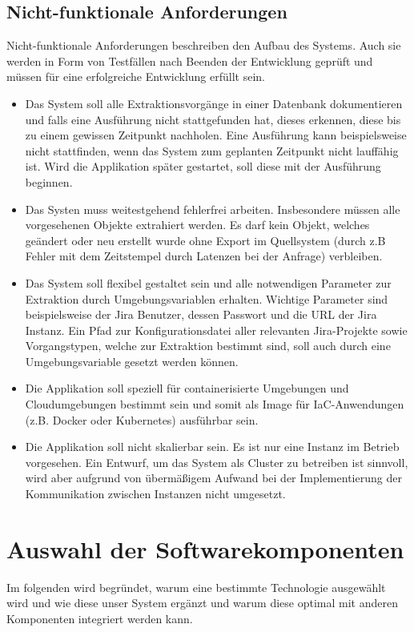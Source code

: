 \documentclass[10pt]{article}
\begin{document}
\subsection{Nicht-funktionale Anforderungen}
Nicht-funktionale Anforderungen beschreiben den Aufbau des Systems. Auch sie werden in Form von Testfällen nach Beenden der Entwicklung geprüft und müssen für eine erfolgreiche Entwicklung erfüllt sein.\\
\begin{itemize}
\item Das System soll alle Extraktionsvorgänge in einer Datenbank dokumentieren und falls eine Ausführung nicht stattgefunden hat, dieses erkennen, diese bis zu einem gewissen Zeitpunkt nachholen. Eine Ausführung kann beispielsweise nicht stattfinden, wenn das System zum geplanten Zeitpunkt nicht lauffähig ist. Wird die Applikation später gestartet, soll diese mit der Ausführung beginnen.
\item Das Systen muss weitestgehend fehlerfrei arbeiten. Insbesondere müssen alle vorgesehenen Objekte extrahiert werden. Es darf kein Objekt, welches geändert oder neu erstellt wurde ohne Export im Quellsystem (durch z.B Fehler mit dem Zeitstempel durch Latenzen bei der Anfrage) verbleiben.
\item Das System soll flexibel gestaltet sein und alle notwendigen Parameter zur Extraktion durch Umgebungsvariablen erhalten. Wichtige Parameter sind beispielsweise der Jira Benutzer, dessen Passwort und die URL der Jira Instanz. Ein Pfad zur Konfigurationsdatei aller relevanten Jira-Projekte sowie Vorgangstypen, welche zur Extraktion bestimmt sind, soll auch durch eine Umgebungsvariable gesetzt werden können.
\item Die Applikation soll speziell für containerisierte Umgebungen und Cloudumgebungen bestimmt sein und somit als Image für IaC-Anwendungen (z.B. Docker oder Kubernetes) ausführbar sein.
\item Die Applikation soll nicht skalierbar sein. Es ist nur eine Instanz im Betrieb vorgesehen. Ein Entwurf, um das System als Cluster zu betreiben ist sinnvoll, wird aber aufgrund von übermäßigem Aufwand bei der Implementierung der Kommunikation zwischen Instanzen nicht umgesetzt.
\end{itemize}
\section{Auswahl der Softwarekomponenten}
Im folgenden wird begründet, warum eine bestimmte Technologie ausgewählt wird und wie diese unser System ergänzt und warum diese optimal mit anderen Komponenten integriert werden kann.
\end{document}
